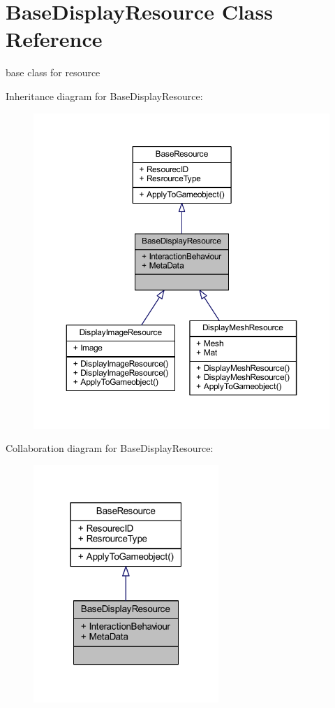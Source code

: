\hypertarget{class_base_display_resource}{}\section{Base\+Display\+Resource Class Reference}
\label{class_base_display_resource}


base class for resource  




Inheritance diagram for Base\+Display\+Resource\+:\nopagebreak
\begin{figure}[H]
\begin{center}
\leavevmode
\includegraphics[width=350pt]{class_base_display_resource__inherit__graph}
\end{center}
\end{figure}


Collaboration diagram for Base\+Display\+Resource\+:\nopagebreak
\begin{figure}[H]
\begin{center}
\leavevmode
\includegraphics[width=199pt]{class_base_display_resource__coll__graph}
\end{center}
\end{figure}
